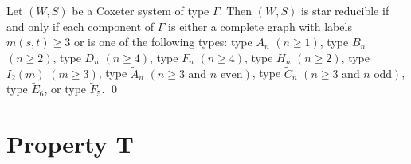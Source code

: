 \begin{proposition}
	Let $(W,S)$ be a Coxeter system of type $\Gamma$. Then $(W,S)$ is star reducible if and only if each component of $\Gamma$ is either a complete graph with labels $m(s,t)\geq 3$ or is one of the following types: type $A_n$ $(n \geq 1)$, type $B_n$ $(n \geq 2)$, type $D_n$ $(n \geq 4)$, type $F_n$ $(n \geq 4)$, type $H_n$ $(n \geq 2)$, type $I_2(m)$ $(m \geq 3)$, type $\widetilde{A}_{n}$ $(n \geq 3 \textrm{ and } n \textrm{ even})$, type $\widetilde{C}_{n}$ $(n\geq 3 \textrm{ and } n \textrm{ odd})$, type $\widetilde{E}_6$, or type $\widetilde{F}_5$. \qed
\end{proposition}    


\section{Property T}\label{sec:Tavoid}


